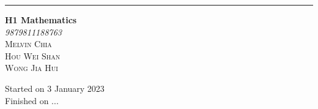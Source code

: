 \documentclass{report}
\begin{document}
\begin{titlepage}
    \raggedleft{}
    \rule{1pt}{\textheight}
    \hspace{0.02\textwidth}
    \parbox[b]{0.75\textwidth}{

    {\fontsize{40}{60}\selectfont\bfseries H1 Mathematics}\\[2\baselineskip]
    {\huge\textit{9879811188763}}\\[3\baselineskip]
    {\Large\textsc{Melvin Chia}}\\[\baselineskip]
    {\Large\textsc{Hou Wei Shan}}\\[\baselineskip]
    {\Large\textsc{Wong Jia Hui}}\\[\baselineskip]

    \vspace{0.5\textheight}

    {\noindent Started on 3 January 2023}\\[\baselineskip]
    {\noindent Finished on ...}\\[\baselineskip]}

\end{titlepage}

\doublespacing{}
\tableofcontents
\singlespacing{}
\newpage
\end{document}
